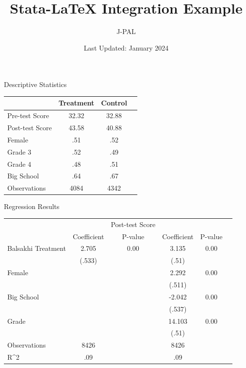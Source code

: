 \documentclass{article}
\title{Stata-LaTeX Integration Example}
\author{J-PAL}
\date{Last Updated: January 2024}
\begin{document}
\maketitle
\begin{center}
\begin{threeparttable}
\caption{Descriptive Statistics}
\begin{tabular}{p{4.5cm}ccc}
\toprule \toprule
& Treatment & Control  \\
\midrule
 Pre-test Score & 32.32 & 32.88 \\ 
 Post-test Score & 43.58 & 40.88 \\ 
 Female & .51 & .52 \\ 
 Grade 3 & .52 & .49 \\ 
 Grade 4 & .48 & .51 \\ 
 Big School & .64 & .67 \\ 
\midrule
Observations & 4084  & 4342  \\ 
\bottomrule
\end{tabular}
\end{threeparttable}
\end{center}
\begin{center}
\begin{threeparttable}
\caption{Regression Results}
\begin{tabular}{p{3cm}ccccc}
\toprule \toprule
& & Post-test Score & \\
& Coefficient & P-value & Coefficient & P-value \\
\midrule
Balsakhi Treatment &  2.705  & 0.00 & 3.135 & 0.00 \\
& (.533)  &     &  (.51) &  \\
 Female  &   & &  2.292 & 0.00 \\ 
& & &  (.511)  &  \\
 Big School  &   & &  -2.042 & 0.00 \\ 
& & &  (.537)  &  \\
 Grade  &   & &  14.103 & 0.00 \\ 
& & &  (.51)  &  \\
\midrule
Observations & 8426  & &  8426 & \\ 
R^2 & .09  & &  .09 & \\ 
\bottomrule
\end{tabular}
\end{threeparttable}
\end{center}
\end{document}

